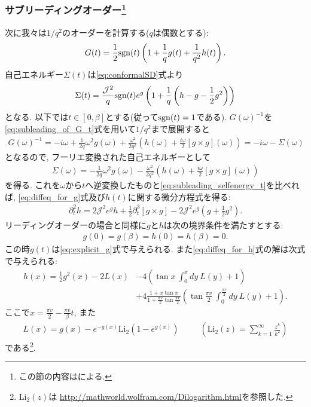 \subsubsection{サブリーディングオーダー\footnote{この節の内容は\cite{tarnopolsky}による.}}
次に我々は$1/q^2$のオーダーを計算する($q$は偶数とする):
\begin{align}
	G(t) = \frac{1}{2}\mathrm{sgn}(t)\left(1 + \frac{1}{q}g(t) + \frac{1}{q^2}h(t)\right).
	\label{eq:subleading_of_G_t}
\end{align}
自己エネルギー$\Sigma(t)$は\eqref{eq:conformalSD}式より
\begin{align}
	\Sigma(t) = \frac{\mathcal{J}^2}{q}\mathrm{sgn}(t)e^g
		\left(
			1 + \frac{1}{q}\left(h - g - \frac{1}{2}g^2\right)
		\right)
	\label{eq:subleading_selfenergy_t}
\end{align}
となる. 
以下では$t \in [0, \beta]$とする(従って$\mathrm{sgn}(t) = 1$である). 
$G(\omega)^{-1}$を\eqref{eq:subleading_of_G_t}式を用いて$1/q^2$まで展開すると
\begin{align}
	G(\omega)^{-1} = -i\omega + \frac{1}{2q}\omega^2 g(\omega)
		+ \frac{\omega^2}{2q^2}\left(
			h(\omega) + \frac{i\omega}{2}[g \times g](\omega)
		\right)
		= -i\omega - \Sigma(\omega)
\end{align}
となるので, フーリエ変換された自己エネルギーとして
\begin{align}
	\Sigma(\omega) = -\frac{1}{2q}\omega^2 g(\omega) - \frac{\omega^2}{2q^2}\left(
			h(\omega) + \frac{i\omega}{2}[g \times g](\omega)
		\right)
\end{align}
を得る. 
これを$\omega$から$t$へ逆変換したものと\eqref{eq:subleading_selfenergy_t}を比べれば, 
\eqref{eq:diffeq_for_g}式及び$h(t)$に関する微分方程式を得る:
\begin{align}
	\partial_t^2 h = 2 \mathcal{J}^2 e^g h + \frac{1}{2}\partial_t^3[g \times g]
		- 2\mathcal{J}^2 e^g \left(g + \frac{1}{2}g^2\right)
	\label{eq:diffeq_for_h}.
\end{align}
リーディングオーダーの場合と同様に$g$と$h$は次の境界条件を満たすとする:
\begin{align}
	g(0) = g(\beta) = h(0) = h(\beta) = 0.
\end{align}
この時$g(t)$は\eqref{eq:explicit_g}式で与えられる. 
また\eqref{eq:diffeq_for_h}式の解は次式で与えられる:
\begin{align}
	h(x) = \frac{1}{2}g^2(x) - 2L(x)
		&- 4\left(\tan x\ \int_0^x dy\ L(y) + 1\right)\nonumber\\
		&+ 4\frac{1 + x\tan x}{1 + \frac{\pi v}{2}\tan \frac{\pi v}{2}}\left(
			\tan \frac{\pi v}{2}\ \int_0^{\frac{\pi v}{2}} dy\ L(y) + 1
		\right).
	\label{eq:explicit_h}
\end{align}
ここで$x = \frac{\pi v}{2} - \frac{\pi v}{\beta}t$, 
また
\begin{align}
	L(x) = g(x) - e^{-g(x)}\mathrm{Li}_2(1 - e^{g(x)})
	\hspace{30pt}
	\left(\mathrm{Li}_2(z) = \sum_{k=1}^{\infty}\frac{z^k}{k^2}\right)
\end{align}
である\footnote{$\mathrm{Li}_2(z)$は
\href{http://mathworld.wolfram.com/Dilogarithm.html}{http://mathworld.wolfram.com/Dilogarithm.html}を参照した. }. 

